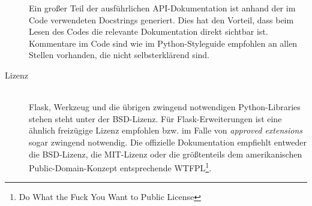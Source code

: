 \begin{description}
Ein großer Teil der ausführlichen API-Dokumentation ist anhand der im Code verwendeten Docstrings
generiert. Dies hat den Vorteil, dass beim Lesen des Codes die relevante Dokumentation direkt
sichtbar ist. Kommentare im Code sind wie im Python-Styleguide empfohlen an allen Stellen vorhanden,
die nicht selbsterklärend sind.


\item[Lizenz] \hfill \\
Flask, Werkzeug und die übrigen zwingend notwendigen Python-Libraries stehen steht unter der
BSD-Lizenz. Für Flask-Erweiterungen ist eine ähnlich freizügige Lizenz empfohlen bzw. im Falle von
\emph{approved extensions} sogar zwingend notwendig. Die offizielle Dokumentation empfiehlt entweder
die BSD-Lizenz, die MIT-Lizenz oder die größtenteils dem amerikanischen Public-Domain-Konzept
entsprechende WTFPL\footnote{Do What the Fuck You Want to Public License}.
\end{description}
